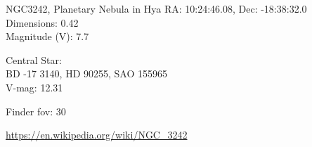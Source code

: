 \begin{block}{NGC3242, Planetary Nebula in Hya}
    RA: 10:24:46.08, Dec: -18:38:32.0 \\ 
    Dimensions: 0.42 \\ 
    Magnitude (V): 7.7

    Central Star: \\ 
      \hspace{1em}BD -17 3140, HD 90255, SAO 155965 \\ 
      \hspace{1em}V-mag: 12.31 


    Finder fov: 30 

    \url{https://en.wikipedia.org/wiki/NGC_3242} 
\end{block}